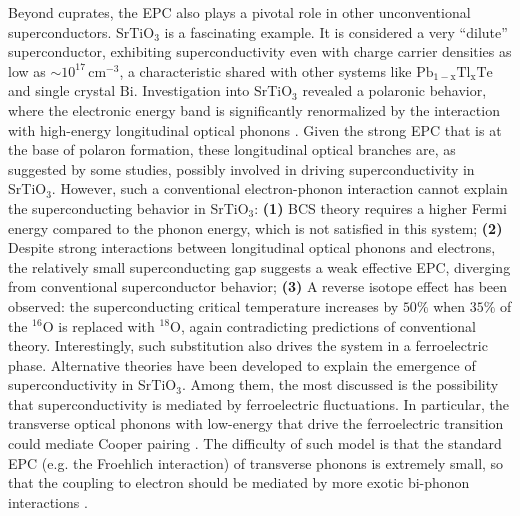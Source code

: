 \documentclass[11pt]{article}
\begin{document}
Beyond cuprates, the EPC also plays a pivotal role in other unconventional superconductors. 
SrTiO$_{3}$ is a fascinating example. It is considered a very ``dilute'' superconductor, exhibiting
superconductivity even with charge carrier densities as low as $\sim 10^{17}\,\mathrm{cm^{-3}}$\cite{schooley_superconductivity_1964,lin_fermi_2013}, a characteristic shared with other systems like $\mathrm{Pb_{1-x}Tl_{x}Te}$\cite{known} and single crystal $\mathrm{Bi}$\cite{prakash_evidence_2017}. 
Investigation into SrTiO$_{3}$ revealed a polaronic behavior, where the electronic energy band is significantly renormalized by the interaction with high-energy longitudinal optical phonons \cite{swartz_polaronic_2018, geondzhian_large_2020}.
Given the strong EPC that is at the base of polaron formation, these longitudinal optical branches are, as suggested by some studies\cite{gastiasoro_supercondutivity_2020}, possibly involved in driving superconductivity in SrTiO$_{3}$.
However, such a conventional electron-phonon interaction cannot explain the superconducting behavior in SrTiO$_{3}$: 
\textbf{(1)} BCS theory requires a higher Fermi energy compared to the phonon energy, which is not satisfied in this system;
\textbf{(2)} Despite strong interactions between longitudinal optical phonons and electrons, the relatively small superconducting gap suggests a weak effective EPC, diverging from conventional superconductor behavior\cite{swartz_polaronic_2018}; 
\textbf{(3)} A reverse isotope effect has been observed: the superconducting critical temperature increases by $50\%$  when $35\%$ of the ${}^{16}\mathrm{O}$ is replaced with ${}^{18}\mathrm{O}$\cite{stucky_isotope_2016}, again contradicting predictions of conventional theory. Interestingly, such substitution also drives the system in a ferroelectric phase\cite{stucky_isotope_2016}.
Alternative theories have been developed to explain the emergence of superconductivity in SrTiO$_{3}$. Among them, the most discussed is the possibility that superconductivity is mediated by ferroelectric fluctuations. In particular, the transverse optical phonons with low-energy that drive the ferroelectric transition could mediate Cooper pairing \cite{gastiasoro_supercondutivity_2020}. The difficulty of such model is that the standard EPC (e.g. the Froehlich interaction) of transverse phonons is extremely small, so that the coupling to electron should be mediated by more exotic bi-phonon interactions \cite{gastiasoro_phonon-mediated_2019}.
\end{document}
